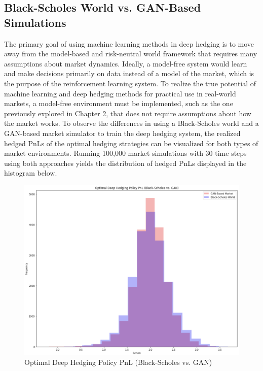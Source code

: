 \subsection{Black-Scholes World vs. GAN-Based Simulations}
The primary goal of using machine learning methods in deep hedging is to move away from the model-based and risk-neutral world framework that requires many assumptions about market dynamics. Ideally, a model-free system would learn and make decisions primarily on data instead of a model of the market, which is the purpose of the reinforcement learning system. To realize the true potential of machine learning and deep hedging methods for practical use in real-world markets, a model-free environment must be implemented, such as the one previously explored in Chapter 2, that does not require assumptions about how the market works. To observe the differences in using a Black-Scholes world and a GAN-based market simulator to train the deep hedging system, the realized hedged PnLs of the optimal hedging strategies can be visualized for both types of market environments. Running 100,000 market simulations with 30 time steps using both approaches yields the distribution of hedged PnLs displayed in the histogram below.
\begin{figure}[h]
\centering
\includegraphics[width=13.5cm]{templates/assets/drl/hedge_pnl.png}
\caption{Optimal Deep Hedging Policy PnL (Black-Scholes vs. GAN)}
\end{figure}

